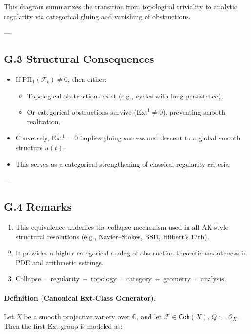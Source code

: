 \documentclass[11pt]{article}
\begin{document}
This diagram summarizes the transition from topological triviality to analytic regularity via categorical gluing and vanishing of obstructions.

---

\subsection*{G.3 Structural Consequences}

\begin{itemize}
  \item If $\mathrm{PH}_1(\mathcal{F}_t) \neq 0$, then either:
    \begin{itemize}
      \item Topological obstructions exist (e.g., cycles with long persistence),
      \item Or categorical obstructions survive ($\mathrm{Ext}^1 \neq 0$), preventing smooth realization.
    \end{itemize}
  \item Conversely, $\mathrm{Ext}^1 = 0$ implies gluing success and descent to a global smooth structure $u(t)$.
  \item This serves as a categorical strengthening of classical regularity criteria.
\end{itemize}

---

\subsection*{G.4 Remarks}

\begin{enumerate}
  \item This equivalence underlies the collapse mechanism used in all AK-style structural resolutions (e.g., Navier–Stokes, BSD, Hilbert's 12th).
  \item It provides a higher-categorical analog of obstruction-theoretic smoothness in PDE and arithmetic settings.
  \item Collapse = regularity ⇔ topology = category ⇔ geometry = analysis.
\end{enumerate}



\paragraph{Definition (Canonical Ext-Class Generator).}

Let \( X \) be a smooth projective variety over \( \mathbb{C} \), and let \( \mathcal{F} \in \mathsf{Coh}(X) \), \( Q := \mathcal{O}_X \).  
Then the first Ext-group is modeled as:
\end{document}
